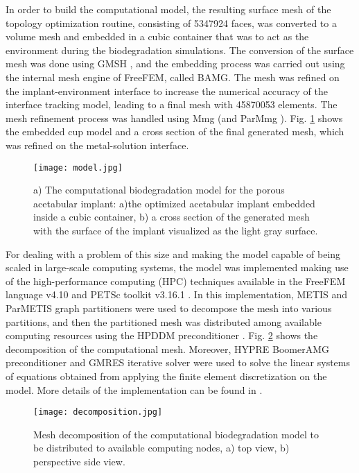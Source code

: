 In order to build the computational model, the resulting surface mesh of the topology optimization routine, consisting of \num{5347924} faces, was converted to a volume mesh and embedded in a cubic container that was to act as the environment during the biodegradation simulations. The conversion of the surface mesh was done using GMSH \cite{Geuzaine2009}, and the embedding process was carried out using the internal mesh engine of FreeFEM, called BAMG. The mesh was refined on the implant-environment interface to increase the numerical accuracy of the interface tracking model, leading to a final mesh with \num{45870053} elements. The mesh refinement process was handled using Mmg \cite{Dapogny2014} (and ParMmg \cite{balarac:hal-03344779}). Fig. \ref{fig:cup_model} shows the embedded cup model and a cross section of the final generated mesh, which was refined on the metal-solution interface.



\begin{figure}[h]
\centering
\medskip
\texttt{[image: model.jpg]}
\caption[Computational biodegradation model for the porous acetabular implant]{a) The computational biodegradation model for the porous acetabular implant: a)the optimized acetabular implant embedded inside a cubic container, b) a cross section of the generated mesh with the surface of the implant visualized as the light gray surface.} \label{fig:cup_model}
\end{figure}

For dealing with a problem of this size and making the model capable of being scaled in large-scale computing systems, the model was implemented making use of the high-performance computing (HPC) techniques available in the FreeFEM language v4.10 and PETSc toolkit v3.16.1 \cite{petsc}. In this implementation, METIS and ParMETIS graph partitioners \cite{METIS1998} were used to decompose the mesh into various partitions, and then the partitioned mesh was distributed among available computing resources using the HPDDM preconditioner \cite{Jolivet2013}. Fig. \ref{fig:cup_decomposition} shows the decomposition of the computational mesh. Moreover, HYPRE BoomerAMG \cite{Falgout2002} preconditioner and GMRES iterative solver \cite{Saad1986} were used to solve the linear systems of equations obtained from applying the finite element discretization on the model. More details of the implementation can be found in \cite{Barzegari2022}.

\begin{figure}[h]
\centering
\medskip
\texttt{[image: decomposition.jpg]}
\caption[Mesh decomposition of the acetabular implant model]{Mesh decomposition of the computational biodegradation model to be distributed to available computing nodes, a) top view, b) perspective side view. } \label{fig:cup_decomposition}
\end{figure}

